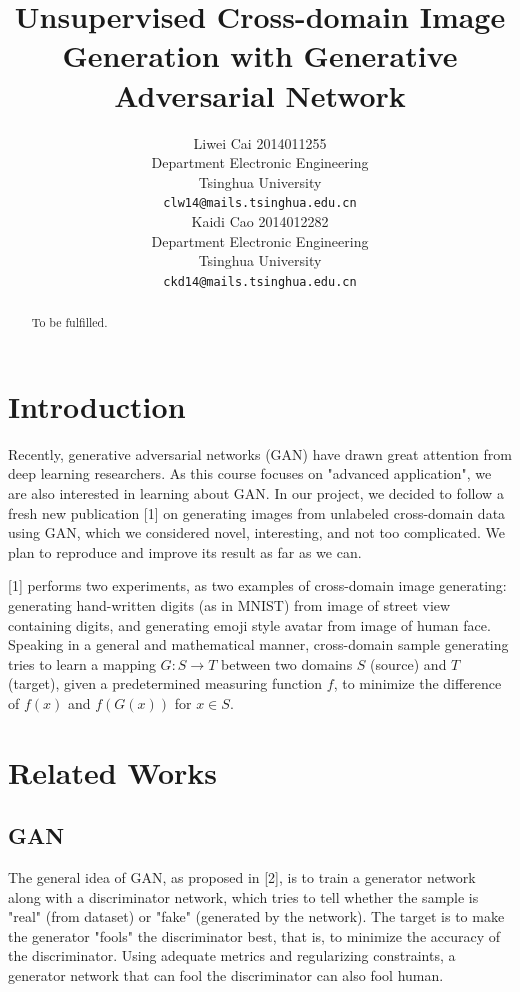 \documentclass{article}
\title{Unsupervised Cross-domain Image Generation with Generative Adversarial Network}
\author{
	Liwei Cai 2014011255\\
	Department Electronic Engineering\\
	Tsinghua University\\
	\texttt{clw14@mails.tsinghua.edu.cn} \\
	\And
	Kaidi Cao 2014012282\\
	Department Electronic Engineering\\
	Tsinghua University\\
	\texttt{ckd14@mails.tsinghua.edu.cn} \\
}
\begin{document}
	
\maketitle
	
\begin{abstract}
To be fulfilled.
\end{abstract}

\section{Introduction}

Recently, generative adversarial networks (GAN) have drawn great attention from deep learning researchers. As this course focuses on "advanced application", we are also interested in learning about GAN. In our project, we decided to follow a fresh new publication [1] on generating images from unlabeled cross-domain data using GAN, which we considered novel, interesting, and not too complicated. We plan to reproduce and improve its result as far as we can.

[1] performs two experiments, as two examples of cross-domain image generating: generating hand-written digits (as in MNIST) from image of street view containing digits, and generating emoji style avatar from image of human face. Speaking in a general and mathematical manner, cross-domain sample generating tries to learn a mapping $G: S \rightarrow T$ between two domains $S$ (source) and $T$ (target), given a predetermined measuring function $f$, to minimize the difference of $f(x)$ and $f(G(x))$ for $x \in S$.

\section{Related Works}

\subsection{GAN}

The general idea of GAN, as proposed in [2], is to train a generator network along with a discriminator network, which tries to tell whether the sample is "real" (from dataset) or "fake" (generated by the network). The target is to make the generator "fools" the discriminator best, that is, to minimize the accuracy of the discriminator. Using adequate metrics and regularizing constraints, a generator network that can fool the discriminator can also fool human.
\end{document}
